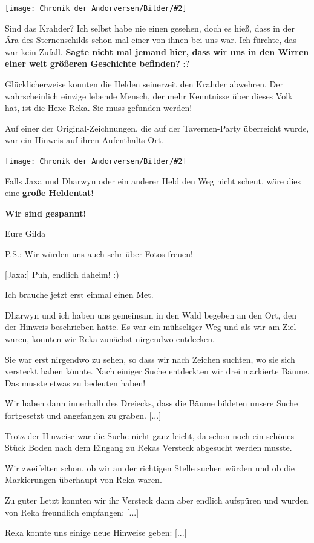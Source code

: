 \documentclass[10pt, a4paper, oneside]{book}
\newcommand{\bildmitts}[2][height=0.32\textwidth,width=0.48\textwidth,keepaspectratio]{%
    \begin{center}
        \texttt{[image: Chronik der Andorversen/Bilder/\#2]}
    \end{center}
}
\begin{document}
\begin{multicols}{2}
\bildmitts{AA2015 Narne tat Vyper 2.jpeg}

Sind das Krahder? Ich selbst habe nie einen gesehen, doch es hieß, dass in der Ära des Sternenschilds schon mal einer von ihnen bei uns war. Ich fürchte, das war kein Zufall. \textbf{Sagte nicht mal jemand hier, dass wir uns in den Wirren einer weit größeren Geschichte befinden?} :?

Glücklicherweise konnten die Helden seinerzeit den Krahder abwehren. Der wahrscheinlich einzige lebende Mensch, der mehr Kenntnisse über dieses Volk hat, ist die Hexe Reka. Sie muss gefunden werden!

Auf einer der Original-Zeichnungen, die auf der Tavernen-Party überreicht wurde, war ein Hinweis auf ihren Aufenthalts-Ort.

\bildmitts{AA2015 Narne tat Vyper 3.jpeg}

Falls Jaxa und Dharwyn oder ein anderer Held den Weg nicht scheut, wäre dies eine \textbf{große Heldentat!}

\textbf{Wir sind gespannt!}


Eure Gilda

P.S.: Wir würden uns auch sehr über Fotos freuen!

[Jaxa:] Puh, endlich daheim! :)

Ich brauche jetzt erst einmal einen Met.

Dharwyn und ich haben uns gemeinsam in den Wald begeben an den Ort, den der Hinweis beschrieben hatte. Es war ein mühseliger Weg und als wir am Ziel waren, konnten wir Reka zunächst nirgendwo entdecken.

Sie war erst nirgendwo zu sehen, so dass wir nach Zeichen suchten, wo sie sich versteckt haben könnte. Nach einiger Suche entdeckten wir drei markierte Bäume. Das musste etwas zu bedeuten haben!

Wir haben dann innerhalb des Dreiecks, dass die Bäume bildeten unsere Suche fortgesetzt und angefangen zu graben. [...] 

Trotz der Hinweise war die Suche nicht ganz leicht, da schon noch ein schönes Stück Boden nach dem Eingang zu Rekas Versteck abgesucht werden musste.

Wir zweifelten schon, ob wir an der richtigen Stelle suchen würden und ob die Markierungen überhaupt von Reka waren.

Zu guter Letzt konnten wir ihr Versteck dann aber endlich aufspüren und wurden von Reka freundlich empfangen: [...]

Reka konnte uns einige neue Hinweise geben: [...]


\end{multicols}
\end{document}
